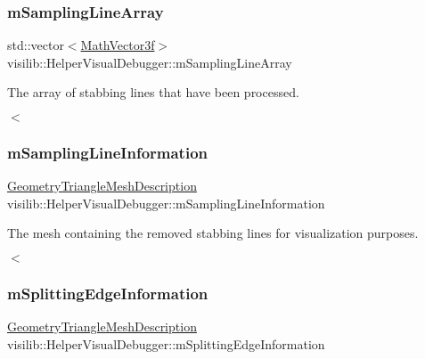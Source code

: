 \subsubsection{\texorpdfstring{mSamplingLineArray}{mSamplingLineArray}}
{\footnotesize\ttfamily std\+::vector$<$\mbox{\hyperlink{classvisilib_1_1_math_vector3__}{Math\+Vector3f}}$>$ visilib\+::\+Helper\+Visual\+Debugger\+::m\+Sampling\+Line\+Array\hspace{0.3cm}{\ttfamily [private]}}



The array of stabbing lines that have been processed. 

$<$ \mbox{\label{classvisilib_1_1_helper_visual_debugger_ad4d6c94e916f2cceb8fb0534dad8b07f}} 
\subsubsection{\texorpdfstring{mSamplingLineInformation}{mSamplingLineInformation}}
{\footnotesize\ttfamily \mbox{\hyperlink{structvisilib_1_1_geometry_triangle_mesh_description}{Geometry\+Triangle\+Mesh\+Description}} visilib\+::\+Helper\+Visual\+Debugger\+::m\+Sampling\+Line\+Information\hspace{0.3cm}{\ttfamily [private]}}



The mesh containing the removed stabbing lines for visualization purposes. 

$<$ \mbox{\label{classvisilib_1_1_helper_visual_debugger_ad728baaee2934cbade4b9f987a19de36}} 
\subsubsection{\texorpdfstring{mSplittingEdgeInformation}{mSplittingEdgeInformation}}
{\footnotesize\ttfamily \mbox{\hyperlink{structvisilib_1_1_geometry_triangle_mesh_description}{Geometry\+Triangle\+Mesh\+Description}} visilib\+::\+Helper\+Visual\+Debugger\+::m\+Splitting\+Edge\+Information\hspace{0.3cm}{\ttfamily [private]}}



